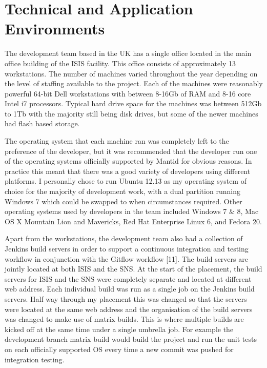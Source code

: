 \documentclass[paper=a4, fontsize=11pt]{scrartcl}	%
\numberwithin{equation}{section}															%
\numberwithin{figure}{section}																%
\numberwithin{table}{section}
\begin{document}
\clearpage
\section{Technical and Application
Environments}\label{technical-and-application-environments}

The development team based in the UK has a single office located in the
main office building of the ISIS facility. This office consists of
approximately 13 workstations. The number of machines varied throughout
the year depending on the level of staffing available to the project.
Each of the machines were reasonably powerful 64-bit Dell workstations
with between 8-16Gb of RAM and 8-16 core Intel i7 processors. Typical
hard drive space for the machines was between 512Gb to 1Tb with the
majority still being disk drives, but some of the newer machines had
flash based storage.

The operating system that each machine ran was completely left to the
preference of the developer, but it was recommended that the developer
run one of the operating systems officially supported by Mantid for
obvious reasons. In practice this meant that there was a good variety of
developers using different platforms. I personally chose to run Ubuntu
12.13 as my operating system of choice for the majority of development
work, with a dual partition running Windows 7 which could be swapped to
when circumstances required. Other operating systems used by developers
in the team included Windows 7 \& 8, Mac OS X Mountain Lion and
Mavericks, Red Hat Enterprise Linux 6, and Fedora 20.

Apart from the workstations, the development team also had a collection of
Jenkins build servers in order to support a continuous integration and
testing workflow in conjunction with the Gitflow workflow {[}11{]}. The
build servers are jointly located at both ISIS and the SNS. At the start
of the placement, the build servers for ISIS and the SNS were completely
separate and located at different web address. Each individual build was
run as a single job on the Jenkins build servers. Half way through my
placement this was changed so that the servers were located at the same
web address and the organisation of the build servers was changed to
make use of matrix builds. This is where multiple builds are kicked
off at the same time under a single umbrella job. For example the
development branch matrix build would build the project and run the unit
tests on each officially supported OS every time a new commit was pushed
for integration testing.
\end{document}
